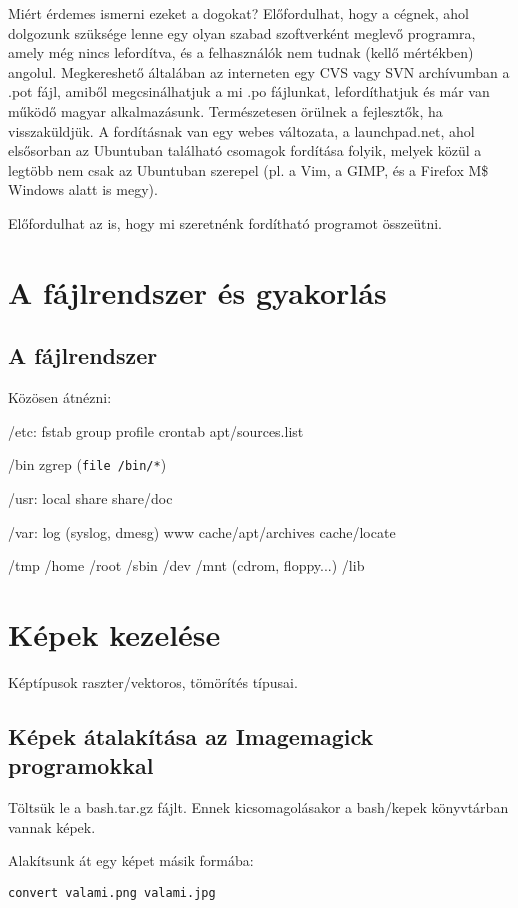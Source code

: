 \documentclass[a4paper]{article}
\newcommand{\code}{\texttt}
\begin{document}
Miért érdemes ismerni ezeket a dogokat? Előfordulhat, hogy a cégnek,
ahol dolgozunk szüksége lenne egy olyan szabad szoftverként meglevő
programra, amely még nincs lefordítva, és a felhasználók nem tudnak
(kellő mértékben) angolul. Megkereshető általában az interneten egy CVS
vagy SVN archívumban a .pot fájl, amiből megcsinálhatjuk a mi .po
fájlunkat, lefordíthatjuk és már van működő magyar alkalmazásunk.
Természetesen örülnek a fejlesztők, ha visszaküldjük. A fordításnak van
egy webes változata, a launchpad.net, ahol elsősorban az Ubuntuban
található csomagok fordítása folyik, melyek közül a legtöbb nem csak az
Ubuntuban szerepel (pl. a Vim, a GIMP, és a Firefox M\$ Windows alatt is
megy).

Előfordulhat az is, hogy mi szeretnénk fordítható programot összeütni.

\newpage
\section{A fájlrendszer és gyakorlás}

\subsection{A fájlrendszer}
Közösen átnézni:

/etc: fstab group profile crontab apt/sources.list

/bin zgrep (\code{file /bin/*})

/usr: local share share/doc

/var: log (syslog, dmesg) www cache/apt/archives cache/locate

/tmp /home /root /sbin /dev /mnt (cdrom, floppy...) /lib

\section{Képek kezelése}
Képtípusok raszter/vektoros, tömörítés típusai.

\subsection{Képek átalakítása az Imagemagick programokkal}

Töltsük le a bash.tar.gz fájlt. Ennek kicsomagolásakor a bash/kepek
könyvtárban vannak képek.

Alakítsunk át egy képet másik formába:
\begin{Verbatim}
convert valami.png valami.jpg
\end{Verbatim}
\end{document}

